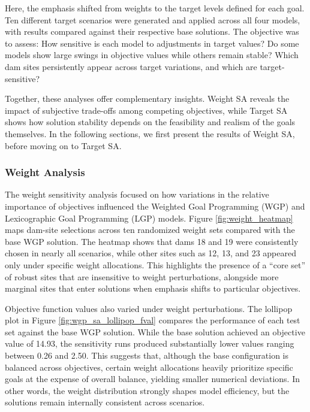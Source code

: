 Here, the emphasis shifted from weights to the target levels defined for each goal. Ten different target scenarios were generated and applied across all four models, with results compared against their respective base solutions. The objective was to assess: How sensitive is each model to adjustments in target values? Do some models show large swings in objective values while others remain stable? Which dam sites persistently appear across target variations, and which are target-sensitive?

Together, these analyses offer complementary insights. Weight SA reveals the impact of subjective trade-offs among competing objectives, while Target SA shows how solution stability depends on the feasibility and realism of the goals themselves. In the following sections, we first present the results of Weight SA, before moving on to Target SA.

\subsubsection{Weight Analysis}
The weight sensitivity analysis focused on how variations in the relative importance of objectives influenced the Weighted Goal Programming (WGP) and Lexicographic Goal Programming (LGP) models. Figure \ref{fig:weight_heatmap} maps dam-site selections across ten randomized weight sets compared with the base WGP solution. The heatmap shows that dams 18 and 19 were consistently chosen in nearly all scenarios, while other sites such as 12, 13, and 23 appeared only under specific weight allocations. This highlights the presence of a “core set” of robust sites that are insensitive to weight perturbations, alongside more marginal sites that enter solutions when emphasis shifts to particular objectives.

Objective function values also varied under weight perturbations. The lollipop plot in Figure \ref{fig:wgp_sa_lollipop_fval} compares the performance of each test set against the base WGP solution. While the base solution achieved an objective value of 14.93, the sensitivity runs produced substantially lower values ranging between 0.26 and 2.50. This suggests that, although the base configuration is balanced across objectives, certain weight allocations heavily prioritize specific goals at the expense of overall balance, yielding smaller numerical deviations. In other words, the weight distribution strongly shapes model efficiency, but the solutions remain internally consistent across scenarios.


